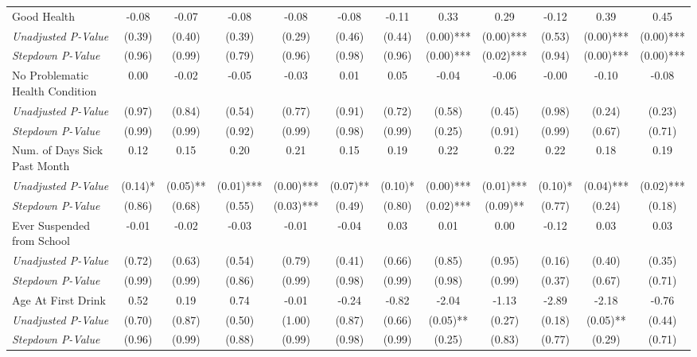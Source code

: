 \begin{tabular}{l c c c c c c c c c c c}
Good Health & -0.08 & -0.07 & -0.08 & -0.08 & -0.08 & -0.11 & 0.33 & 0.29 & -0.12 & 0.39 & 0.45 \\
\quad \textit{Unadjusted P-Value} & (0.39) & (0.40) & (0.39) & (0.29) & (0.46) & (0.44) & (0.00)*** & (0.00)*** & (0.53) & (0.00)*** & (0.00)*** \\
\quad \textit{Stepdown P-Value} & (0.96) & (0.99) & (0.79) & (0.96) & (0.98) & (0.96) & (0.00)*** & (0.02)*** & (0.94) & (0.00)*** & (0.00)*** \\
No Problematic Health Condition & 0.00 & -0.02 & -0.05 & -0.03 & 0.01 & 0.05 & -0.04 & -0.06 & -0.00 & -0.10 & -0.08 \\
\quad \textit{Unadjusted P-Value} & (0.97) & (0.84) & (0.54) & (0.77) & (0.91) & (0.72) & (0.58) & (0.45) & (0.98) & (0.24) & (0.23) \\
\quad \textit{Stepdown P-Value} & (0.99) & (0.99) & (0.92) & (0.99) & (0.98) & (0.99) & (0.25) & (0.91) & (0.99) & (0.67) & (0.71) \\
Num. of Days Sick Past Month & 0.12 & 0.15 & 0.20 & 0.21 & 0.15 & 0.19 & 0.22 & 0.22 & 0.22 & 0.18 & 0.19 \\
\quad \textit{Unadjusted P-Value} & (0.14)* & (0.05)** & (0.01)*** & (0.00)*** & (0.07)** & (0.10)* & (0.00)*** & (0.01)*** & (0.10)* & (0.04)*** & (0.02)*** \\
\quad \textit{Stepdown P-Value} & (0.86) & (0.68) & (0.55) & (0.03)*** & (0.49) & (0.80) & (0.02)*** & (0.09)** & (0.77) & (0.24) & (0.18) \\
Ever Suspended from School & -0.01 & -0.02 & -0.03 & -0.01 & -0.04 & 0.03 & 0.01 & 0.00 & -0.12 & 0.03 & 0.03 \\
\quad \textit{Unadjusted P-Value} & (0.72) & (0.63) & (0.54) & (0.79) & (0.41) & (0.66) & (0.85) & (0.95) & (0.16) & (0.40) & (0.35) \\
\quad \textit{Stepdown P-Value} & (0.99) & (0.99) & (0.86) & (0.99) & (0.98) & (0.99) & (0.98) & (0.99) & (0.37) & (0.67) & (0.71) \\
Age At First Drink & 0.52 & 0.19 & 0.74 & -0.01 & -0.24 & -0.82 & -2.04 & -1.13 & -2.89 & -2.18 & -0.76 \\
\quad \textit{Unadjusted P-Value} & (0.70) & (0.87) & (0.50) & (1.00) & (0.87) & (0.66) & (0.05)** & (0.27) & (0.18) & (0.05)** & (0.44) \\
\quad \textit{Stepdown P-Value} & (0.96) & (0.99) & (0.88) & (0.99) & (0.98) & (0.99) & (0.25) & (0.83) & (0.77) & (0.29) & (0.71) \\
\bottomrule
\end{tabular}
